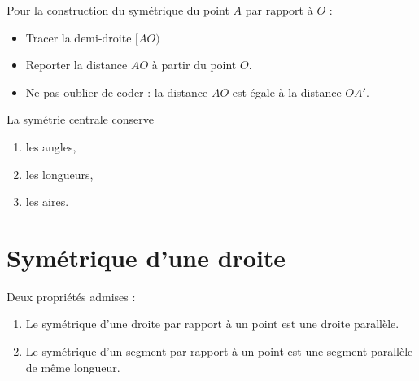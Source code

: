 Pour la construction du symétrique du point \( A\) par rapport à \( O\) :
\begin{itemize}
    \item Tracer la demi-droite \(  [AO) \)
    \item Reporter la distance \( AO\) à partir du point \( O\).
    \item Ne pas oublier de coder : la distance \( AO\) est égale à la distance \( OA'\).
\end{itemize}

\begin{center}
    
\end{center}

\begin{propriete}
    La symétrie centrale conserve
    \begin{enumerate}
        \item
            les angles,
        \item
            les longueurs,
        \item
            les aires.
    \end{enumerate}
\end{propriete}

\section{Symétrique d'une droite}



Deux propriétés admises :
\begin{propriete}
    \begin{enumerate}
        \item
            Le symétrique d'une droite par rapport à un point est une droite parallèle.
        \item
            Le symétrique d'un segment par rapport à un point est une segment parallèle de même longueur.
    \end{enumerate}
\end{propriete}
